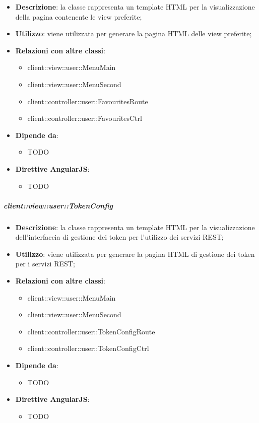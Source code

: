 			\begin{itemize}
				\item \textbf{Descrizione}: la classe rappresenta un template HTML per la visualizzazione della pagina contenente le view preferite;
				\item \textbf{Utilizzo}: viene utilizzata per generare la pagina HTML delle view preferite;
				\item \textbf{Relazioni con altre classi}:
					\begin{itemize}
						\item client::view::user::MenuMain
						\item client::view::user::MenuSecond
						\item client::controller::user::FavouritesRoute
						\item client::controller::user::FavouritesCtrl
					\end{itemize}
				\item \textbf{Dipende da}:
					\begin{itemize}
						\item TODO
					\end{itemize}
				\item \textbf{Direttive AngularJS}:
					\begin{itemize}
						\item TODO
					\end{itemize}
			\end{itemize}

		\subparagraph{client::view::user::TokenConfig} %
		\label{subp:bdsm_app_client_view_user_tokenconfig}

			\begin{itemize}
				\item \textbf{Descrizione}: la classe rappresenta un template HTML per la visualizzazione dell'interfaccia di gestione dei token per l'utilizzo dei servizi REST;
				\item \textbf{Utilizzo}: viene utilizzata per generare la pagina HTML di gestione dei token per i servizi REST;
				\item \textbf{Relazioni con altre classi}:
					\begin{itemize}
						\item client::view::user::MenuMain
						\item client::view::user::MenuSecond
						\item client::controller::user::TokenConfigRoute
						\item client::controller::user::TokenConfigCtrl
					\end{itemize}
				\item \textbf{Dipende da}:
					\begin{itemize}
						\item TODO
					\end{itemize}
				\item \textbf{Direttive AngularJS}:
					\begin{itemize}
						\item TODO
					\end{itemize}
			\end{itemize}

